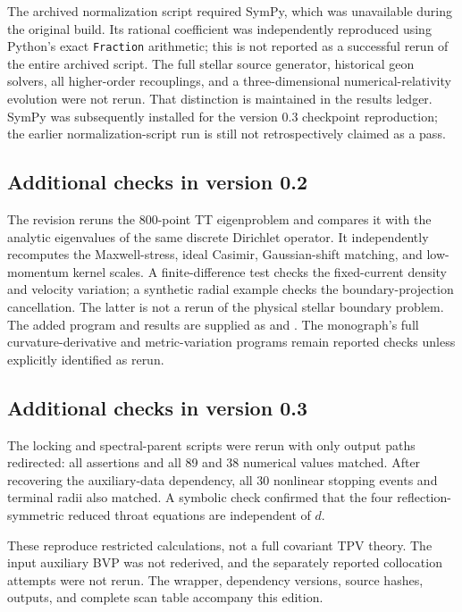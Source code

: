 \documentclass[11pt,oneside]{report}
\begin{document}
The archived normalization script required SymPy, which was unavailable during the original build. Its rational coefficient was independently reproduced using Python's exact \texttt{Fraction} arithmetic; this is not reported as a successful rerun of the entire archived script. The full stellar source generator, historical geon solvers, all higher-order recouplings, and a three-dimensional numerical-relativity evolution were not rerun. That distinction is maintained in the results ledger. SymPy was subsequently installed for the version 0.3 checkpoint reproduction; the earlier normalization-script run is still not retrospectively claimed as a pass.

\subsection{Additional checks in version 0.2}
The revision reruns the 800-point TT eigenproblem and compares it with the analytic eigenvalues of the same discrete Dirichlet operator. It independently recomputes the Maxwell-stress, ideal Casimir, Gaussian-shift matching, and low-momentum kernel scales. A finite-difference test checks the fixed-current density and velocity variation; a synthetic radial example checks the boundary-projection cancellation. The latter is not a rerun of the physical stellar boundary problem. The added program and results are supplied as  and . The monograph's full curvature-derivative and metric-variation programs remain reported checks unless explicitly identified as rerun.

\subsection{Additional checks in version 0.3}
The locking and spectral-parent scripts were rerun with only output paths redirected: all assertions and all 89 and 38 numerical values matched. After recovering the auxiliary-data dependency, all 30 nonlinear stopping events and terminal radii also matched. A symbolic check confirmed that the four reflection-symmetric reduced throat equations are independent of $d$.

These reproduce restricted calculations, not a full covariant TPV theory. The input auxiliary BVP was not rederived, and the separately reported collocation attempts were not rerun. The wrapper, dependency versions, source hashes, outputs, and complete scan table accompany this edition.
\end{document}
